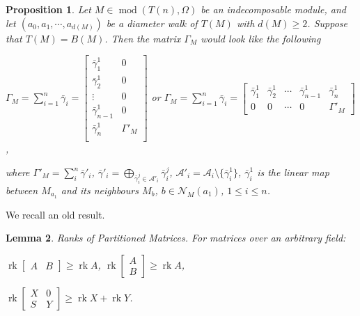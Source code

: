 \documentclass[a4paper,12pt]{amsart}
\newcommand{\cA}{\mathcal{A}}
\newcommand{\bg}{\bar{\gamma}}
\newcommand{\cN}{\mathcal{N}}
\DeclareMathOperator{\rk}{rk}
\DeclareMathOperator{\modd}{mod}
\newtheorem{proposition}{Proposition}[section]
\newtheorem{Lemma}[proposition]{Lemma}
\begin{document}
\begin{proposition}\label{position}
Let $M\in \modd(T(n),\Omega)$ be an indecomposable module, and let $(a_0,a_1,\cdots,a_{d(M)})$ be a diameter walk of $T(M)$ with $d(M)\geq 2$. Suppose that $T(M)=B(M)$. Then the matrix $\Gamma_M$ would look like the following
\begin{center}


$\Gamma_M=\sum^n_{i=1}\bg_i = \begin{bmatrix}
\bg^1_1 & 0\\
\bg^1_2 & 0\\
\vdots & 0\\
\bg^1_{n-1} & 0 \\
\bg^1_n & \Gamma'_M \\

\end{bmatrix}$ or  $\Gamma_M=\sum^n_{i=1}\bg_i = \begin{bmatrix}
\bg^1_1 & \bg^1_2 & \cdots & \bg^1_{n-1} & \bg^1_n \\
0 & 0 & \cdots & 0  & \Gamma'_M 
\end{bmatrix}$,
\end{center}
where  $\Gamma'_M=\sum^{n}_i \bg'_i$, $\bg'_i=\bigoplus_{\bg^j_i\in \cA'_i}\bg^j_i$, $\cA'_i=\cA_i\setminus \{\bg^1_i\}$,   $\bg^1_i$ is the linear map between  $M_{a_1}$ and its neighbours $M_b$, $b\in \cN_M(a_1)$, $1\leq i\leq n$.

\end{proposition}





We recall an old result.

\begin{Lemma}\cite [Theorem 19, $(8.1), (8.2), (8.7)$]  {George}\label{matrix}  Ranks of Partitioned Matrices. For matrices over an arbitrary
field:

\begin{center}
 $\rk \begin{bmatrix}
A & B
\end{bmatrix}  \geq  \rk A$,  $\rk \begin{bmatrix}
A \\
B
\end{bmatrix}\geq \rk A$,

 $\rk \begin{bmatrix}
X & 0 \\
S & Y
\end{bmatrix}\geq \rk X+ \rk Y$.


\end{center}

\end{Lemma}
\end{document}
